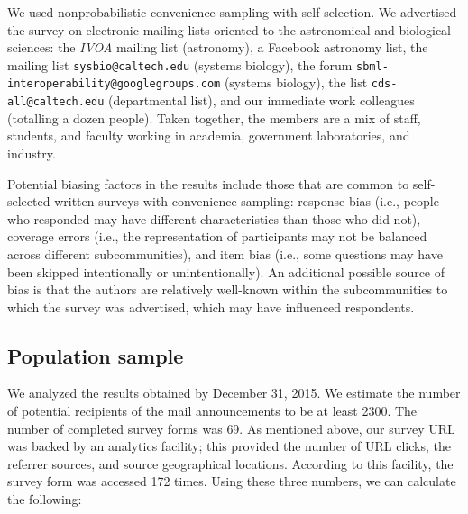\documentclass[review]{elsarticle}
\newcommand{\totalRespondents}{69\xspace}
\begin{document}
%

\newcommand{\totalPotentialRecipients}{2300\xspace}
\newcommand{\totalClicks}{172\xspace}
\newcommand{\accessRate}{7.5\%\xspace}
\newcommand{\populationResponseRate}{3\%\xspace}
\newcommand{\completionRate}{40\%\xspace}

We used nonprobabilistic convenience sampling with self-selection.  We advertised the survey on electronic mailing lists oriented to the astronomical and biological sciences: the \emph{IVOA} mailing list (astronomy), a Facebook astronomy list, the mailing list \texttt{sysbio@caltech.edu} (systems biology), the forum \texttt{sbml-interoperability@googlegroups.com} (systems biology), the list \texttt{cds-all@caltech.edu} (departmental list), and our immediate work colleagues (totalling a dozen people).  Taken together, the members are a mix of staff, students, and faculty working in academia, government laboratories, and industry.

Potential biasing factors in the results include those that are common to self-selected written surveys with convenience sampling: response bias (i.e., people who responded may have different characteristics than those who did not), coverage errors (i.e., the representation of participants may not be balanced across different subcommunities), and item bias (i.e., some questions may have been skipped intentionally or unintentionally).  An additional possible source of bias is that the authors are relatively well-known within the subcommunities to which the survey was advertised, which may have influenced respondents.  


\subsection{Population sample}
\label{population-sample}

We analyzed the results obtained by December 31, 2015.  We estimate the number of potential recipients of the mail announcements to be at least \totalPotentialRecipients.  The number of completed survey forms was \totalRespondents.  As mentioned above, our survey URL was backed by an analytics facility; this provided the number of URL clicks, the referrer sources, and source geographical locations.  According to this facility, the survey form was accessed \totalClicks times.  Using these three numbers, we can calculate the following:
\end{document}
